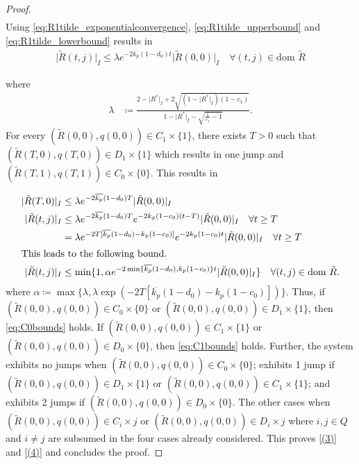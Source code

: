 \documentclass{article}
\newcommand{\dom}{\text{dom }}
\newcommand{\Rtilde}{\tilde{R}}
\newcommand{\normSOthree}[1]{{{\vert}#1 {\vert}_I}}
\newcommand{\expo}[1]{e^{#1}}
\newcommand{\Rstar}{{R^*}}
\begin{document}
\begin{proof}
\begin{align}
\end{align}
Using \eqref{eq:R1tilde_exponentialconvergence}, \eqref{eq:R1tilde_upperbound} and \eqref{eq:R1tilde_lowerbound} results in
\begin{align}
    \normSOthree{\Rtilde(t,j)} \leq \lambda \expo{-2\overline{k_p}(1-d_0)t}\normSOthree{\Rtilde(0,0)} \quad \forall (t,j)\in \dom \Rtilde
\end{align}
\begin{flushleft}
where 
\begin{align}
    \lambda &\coloneqq {\frac{2 - \normSOthree{\Rstar} + 2\sqrt{(1-\normSOthree{\Rstar})(1-c_1)}}{1 - \normSOthree{\Rstar} - \sqrt{\frac{1}{c_1}-1}}}. \label{eq:lambda}
\end{align}
For every ${(\Rtilde(0,0), q(0,0))}\in C_1\times\{1\}$, there exists $T > 0$ such that ${(\Rtilde(T,0), q(T,0))}\in D_1\times\{1\}$ which results in one jump and ${(\Rtilde(T,1), q(T,1))}\in C_0\times\{0\}$. This results in
\end{flushleft}
\begin{align}
    \normSOthree{\Rtilde(T,0)}&\leq \lambda \expo{-2\overline{k_p}(1-d_0)T}\normSOthree{\Rtilde(0,0)}\nonumber\\
    \normSOthree{\Rtilde(t,j)} &\leq \lambda \expo{-2\overline{k_p}(1-d_0)T} \expo{-2k_p(1-c_0)(t-T)}\normSOthree{\Rtilde(0,0)} \quad \forall t \geq T\nonumber\\
    &= \lambda \expo{-2T[\overline{k_p}(1-d_0) - k_p(1-c_0)]}\expo{-2k_p(1-c_0)t}\normSOthree{\Rtilde(0,0)} \quad \forall t\geq T\nonumber\\
    \intertext{This leads to the following bound.}
    \normSOthree{\Rtilde(t,j)}&\leq \min\{1, \alpha\expo{-2\min\{\overline{k_p}(1-d_0), k_p(1-c_0)\} t}\normSOthree{\Rtilde(0,0)}\} \quad \forall (t,j) \in \dom\Rtilde. \label{eq:C1bounds}
    \end{align}
where $\alpha \coloneqq \max\{\lambda, \lambda \exp{(-2T[\overline{k_p}(1-d_0) - k_p(1-c_0)])}\}$. Thus, if ${(\Rtilde(0,0), q(0,0))}\in C_0\times\{0\}$ or ${(\Rtilde(0,0), q(0,0))}\in D_1\times\{1\}$, then \eqref{eq:C0bounds} holds. If ${(\Rtilde(0,0), q(0,0))}\in C_1\times\{1\}$ or ${(\Rtilde(0,0), q(0,0))}\in D_0\times\{0\}$, then \eqref{eq:C1bounds} holds. Further, the system exhibits no jumps when ${(\Rtilde(0,0), q(0,0))}\in C_0\times\{0\}$; exhibits 1 jump if ${(\Rtilde(0,0), q(0,0))}\in D_1\times\{1\}$ or ${(\Rtilde(0,0), q(0,0))}\in C_1\times\{1\}$; and exhibits 2 jumps if ${(\Rtilde(0,0), q(0,0))}\in D_0\times\{0\}$. The other cases when $(\Rtilde(0,0), q(0,0))\in C_i\times j$ or $(\Rtilde(0,0), q(0,0))\in D_i\times j$ where $i,j\in Q$ and $i\neq j$ are subsumed in the four cases already considered. This proves \eqref{(3)} and \eqref{(4)} and concludes the proof. 
\end{proof}
\end{document}
